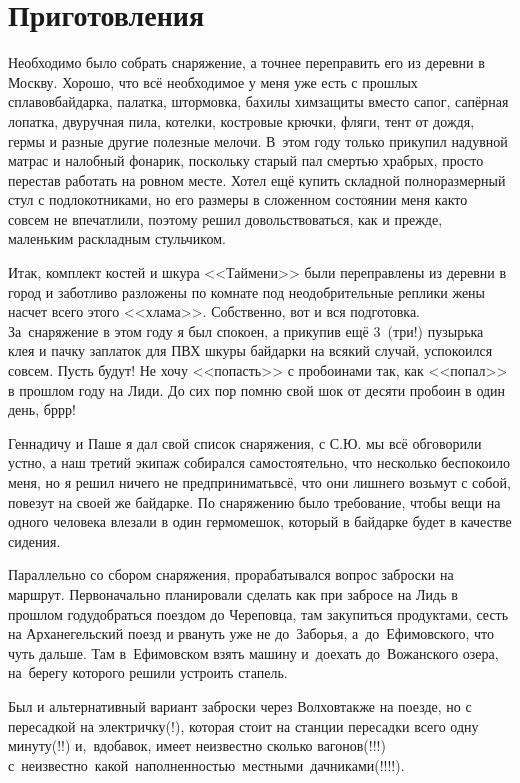 \chapter{Приготовления} 
\vepsianrose

Необходимо было собрать снаряжение, а точнее переправить его из деревни в Москву. Хорошо, что всё необходимое у меня уже есть с прошлых сплавов\mdash  байдарка, палатка, штормовка, бахилы химзащиты вместо сапог, сапёрная лопатка, двуручная пила, котелки, костровые крючки, фляги, тент от дождя, гермы и разные другие полезные мелочи. В~этом году только прикупил надувной матрас и налобный фонарик, поскольку старый пал смертью храбрых, просто перестав работать на ровном месте. Хотел ещё купить складной полноразмерный стул с подлокотниками, но его размеры в сложенном состоянии меня как\sdash то совсем не впечатлили, поэтому решил довольствоваться, как и прежде, маленьким раскладным стульчиком.

Итак, комплект костей и шкура <<Таймени>> были переправлены из деревни в город и заботливо разложены по комнате под неодобрительные реплики жены насчет всего этого <<хлама>>. Собственно, вот и вся подготовка. За~снаряжение в этом году я был спокоен, а прикупив ещё 3~(три!) пузырька клея и пачку заплаток для ПВХ шкуры байдарки на всякий случай, успокоился совсем. Пусть будут! Не хочу <<попасть>> с пробоинами так, как <<попал>> в прошлом году на Лиди. До сих пор помню свой шок от десяти пробоин в один день, бр\sdash р\sdash р!

Геннадичу и Паше я дал свой список снаряжения, с С.Ю. мы всё обговорили устно, а наш третий экипаж собирался самостоятельно, что несколько беспокоило меня, но я решил ничего не предпринимать\mdash всё, что они лишнего возьмут с собой, повезут на своей же байдарке. По снаряжению было требование, чтобы вещи на одного человека влезали в один гермомешок, который в байдарке будет в качестве сидения.

Параллельно со сбором снаряжения, прорабатывался вопрос заброски на маршрут. Первоначально планировали сделать как при забросе на Лидь в прошлом году\mdash добраться поездом до Череповца, там закупиться продуктами, сесть на Арханегельский поезд и рвануть уже не до~Заборья, а~до~Ефимовского, что чуть дальше. Там в~Ефимовском взять машину и~доехать до~Вожанского озера, на~берегу которого решили устроить стапель. 

Был и альтернативный вариант заброски через Волхов\mdash также на поезде, но с пересадкой на электричку(!), которая стоит на станции пересадки всего одну минуту(!!) и,~вдобавок, имеет неизвестно сколько вагонов(!!!) с~неизвестно~какой~наполненностью~местными~дачниками(!!!!). 

